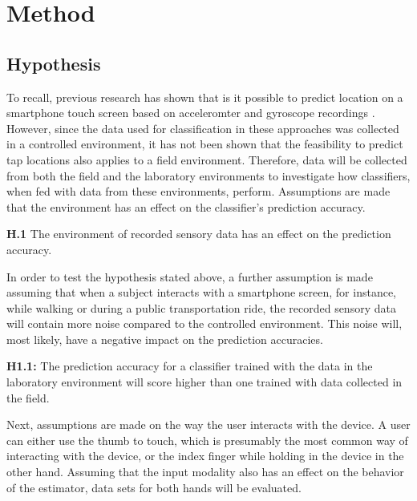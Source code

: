\chapter{Method\label{cha:chapter5}}

\section{Hypothesis}
To recall, previous research has shown that is it possible to predict location on a smartphone touch screen based on acceleromter and gyroscope recordings \cite{Tapprints, Accessory, Touchlogger}. However, since the data used for classification in these approaches was collected in a controlled environment, it has not been shown that the feasibility to predict tap locations also applies to a field environment. Therefore, data will be collected from both the field and the laboratory environments to investigate how classifiers, when fed with data from these environments, perform. Assumptions are made that the environment has an effect on the classifier's prediction accuracy.

\begin{center}
  \begin{mdframed}[backgroundcolor=gray!10] 
    \textbf{H.1}  The environment of recorded sensory data has an effect on the prediction accuracy.
  \end{mdframed}
\end{center}

In order to test the hypothesis stated above, a further assumption is made assuming that when a subject interacts with a smartphone screen, for instance, while walking or during a public transportation ride, the recorded sensory data will contain more noise compared to the controlled environment. This noise will, most likely, have a negative impact on the prediction accuracies. 

\begin{center}
  \begin{framed}
    \textbf{H1.1:} The prediction accuracy for a classifier trained with the data in the laboratory environment will score higher than one trained with data collected in the field.
  \end{framed}
\end{center}

Next, assumptions are made on the way the user interacts with the device. A user can either use the thumb to touch, which is presumably the most common way of interacting with the device, or the index finger while holding in the device in the other hand. Assuming that the input modality also has an effect on the behavior of the estimator, data sets for both hands will be evaluated.

